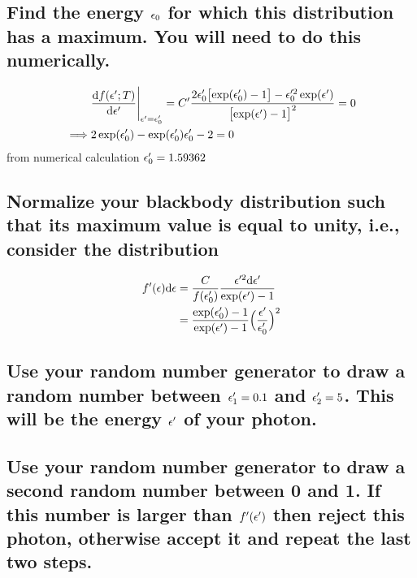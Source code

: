 \documentclass[paper=letter, fontsize=11pt]{scrartcl} %
\numberwithin{equation}{section} %
\numberwithin{figure}{section} %
\numberwithin{table}{section} %
\begin{document}
\subsection{Find the energy $\epsilon_0$ for which this distribution has a
  maximum. You will need to do this numerically.}
\newcommand{\ddfrac}[2]{\ensuremath{\frac{\dd #1}{\dd #2}}}
\begin{align}
  &\ddfrac{f(\epsi';T)}{\epsi'}\Biggr |_{\epsi' =\epsi'_{0}} = C'
  \frac{2\epsi_{0}'\bigl[\exp(\epsi_{0}') - 1\bigr] - \epsi'^{2}_{0}
                                                              \exp(\epsi')}{\bigl[\exp(\epsi') -1\bigr]^{2}}=0\\
  \implies &2\exp(\epsi'_{0})-\exp(\epsi'_{0})\epsi'_{0} -2=0
\end{align}
from numerical calculation $\epsilon'_0 = 1.59362$
\subsection{Normalize your blackbody distribution such that its
  maximum value is equal to unity, i.e., consider the distribution}
\begin{equation}
  \begin{split}
  f'(\epsilon)\mathrm{d} \epsilon &= \frac{C}{f(\epsilon'_{0})} \frac{\epsilon'^{2}\mathrm{d}
    \epsilon'}{\exp(\epsilon') - 1}\\
  &=\frac{\exp(\epsilon'_{0}) - 1}{\exp(\epsilon') - 1}\Bigl(\frac{\epsilon'}{\epsilon_{0}'}\Bigr)^{2}
  \end{split}
  \end{equation}

  \subsection{Use your random number generator to draw a random number
    between $\epsilon'_{1}=0.1$ and $\epsilon'_{2} = 5$. This will be the energy $\epsilon'$ of your
    photon.}\label{sec:-3}

  \subsection{Use your random number generator to draw a second random
    number between 0 and 1. If this number is larger than $f'(\epsilon')$ then
    reject this photon, otherwise accept it and repeat the last two
    steps.}
\end{document}
